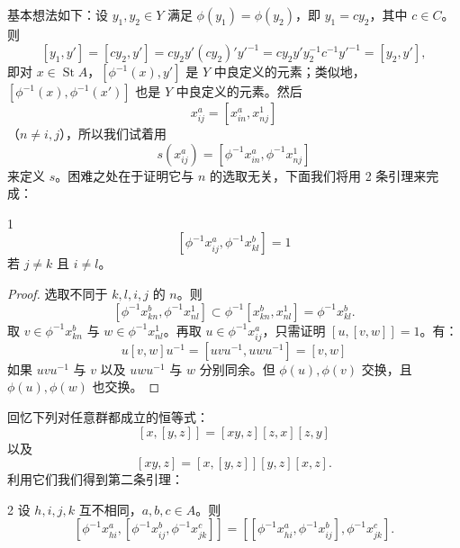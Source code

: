 基本想法如下：设 $y_1,y_2\in Y$ 满足 $\phi(y_1)=\phi(y_2)$，即 $y_1=cy_2$，其中 $c\in C$。则
\[
  [y_1,y'] = [cy_2,y'] = cy_2y'(cy_2)'y'^{-1} = cy_2y'y_2^{-1}c^{-1}y'^{-1} = [y_2,y'],
\]
即对 $x\in\operatorname{St}A$，$[\phi^{-1}(x),y']$ 是 $Y$ 中良定义的元素；类似地，$[\phi^{-1}(x),\phi^{-1}(x')]$ 也是 $Y$ 中良定义的元素。然后
\[
  x_{ij}^a = [x_{in}^a, x_{nj}^1]
\]
（$n\ne i,j$），所以我们试着用
\[
  s(x_{ij}^a) = [\phi^{-1}x_{in}^a, \phi^{-1}x_{nj}^1]
\]
来定义 $s$。困难之处在于证明它与 $n$ 的选取无关，下面我们将用 2 条引理来完成：

\begin{lem}{1}
\[
  [\phi^{-1}x_{ij}^a, \phi^{-1}x_{kl}^b] = 1
\]
若 $j\ne k$ 且 $i\ne l$。
\end{lem}

\begin{proof}
选取不同于 $k,l,i,j$ 的 $n$。则
\[
  [\phi^{-1}x_{kn}^b, \phi^{-1}x_{nl}^1] \subset \phi^{-1}[x_{kn}^b, x_{nl}^1] = \phi^{-1}x_{kl}^b.
\]
取 $v\in\phi^{-1}x_{kn}^b$ 与 $w\in\phi^{-1}x_{nl}^1$。再取 $u\in\phi^{-1}x_{ij}^a$，只需证明 $[u,[v,w]]=1$。有：
\[
  u[v,w]u^{-1} = [uvu^{-1}, uwu^{-1}] = [v,w]
\]
如果 $uvu^{-1}$ 与 $v$ 以及 $uwu^{-1}$ 与 $w$ 分别同余。但 $\phi(u),\phi(v)$ 交换，且 $\phi(u),\phi(w)$ 也交换。
\end{proof}

回忆下列对任意群都成立的恒等式：
\[
  [x,[y,z]] = [xy,z][z,x][z,y]
\]
以及
\[
  [xy,z] = [x,[y,z]][y,z][x,z].
\]
利用它们我们得到第二条引理：

\begin{lem}{2}
设 $h,i,j,k$ 互不相同，$a,b,c\in A$。则
\[
  [\phi^{-1}x_{hi}^a, [\phi^{-1}x_{ij}^b, \phi^{-1}x_{jk}^c]] = [[\phi^{-1}x_{hi}^a, \phi^{-1}x_{ij}^b], \phi^{-1}x_{jk}^c].
\]
\end{lem}


